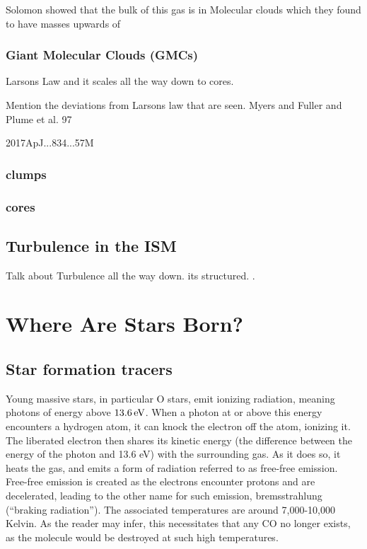 \documentclass[../dissertation.tex]{subfiles}
\begin{document}
Solomon showed that the bulk of this gas is in Molecular clouds which they found to have masses upwards of
\citet{1987ApJ...319..730S}

\subsubsection{Giant Molecular Clouds (GMCs)}
Larsons Law and it scales all the way down to cores.

Mention the deviations from Larsons law that are seen. Myers and Fuller and Plume et al. 97

2017ApJ...834...57M
\subsubsection{clumps}

\subsubsection{cores}



\subsection{Turbulence in the ISM}
Talk about Turbulence all the way down. its structured.
\citep[p. 52]{2009ARA&A..47...27K}.









\section{Where Are Stars Born?}

\subsection{Star formation tracers}

Young massive stars, in particular O stars, emit ionizing radiation, meaning photons of energy above $13.6 \,{\rm eV}$. 
When a photon at or above this energy encounters a hydrogen atom, it can knock the electron off the atom, ionizing it. 
The liberated electron then shares its kinetic energy (the difference between the energy of the photon and 13.6 eV) with the surrounding gas. 
As it does so, it heats the gas, and emits a form of radiation referred to as free-free emission. 
Free-free emission is created as the electrons encounter protons and are decelerated, leading to the other name for such emission, bremsstrahlung (``braking radiation''). 
The associated temperatures are around 7,000-10,000 Kelvin. 
As the reader may infer, this necessitates that any CO no longer exists, as the molecule would be destroyed at such high temperatures.
\end{document}
